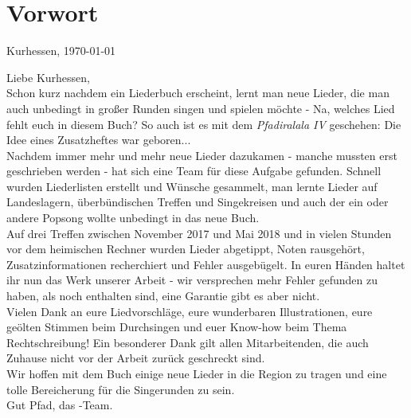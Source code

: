 \section*{Vorwort}

\begin{flushright} 
    Kurhessen, \today
\end{flushright}

Liebe Kurhessen, \\ 

Schon kurz nachdem ein Liederbuch erscheint, lernt man neue Lieder, die man auch unbedingt in großer Runden singen und spielen möchte - Na, welches Lied fehlt euch in diesem Buch? So auch ist es mit dem \emph{Pfadiralala IV} geschehen: Die Idee eines Zusatzheftes war geboren... \\

Nachdem immer mehr und mehr neue Lieder dazukamen - manche mussten erst geschrieben werden - hat sich eine Team für diese Aufgabe gefunden. Schnell wurden Liederlisten erstellt und Wünsche gesammelt, man lernte Lieder auf Landeslagern, überbündischen Treffen und Singekreisen und auch der ein oder andere Popsong wollte unbedingt in das neue Buch. \\

Auf drei Treffen zwischen November 2017 und Mai 2018 und in vielen Stunden vor dem heimischen Rechner wurden Lieder abgetippt, Noten rausgehört, Zusatzinformationen recherchiert und Fehler ausgebügelt. In euren Händen haltet ihr nun das Werk unserer Arbeit - wir versprechen mehr Fehler gefunden zu haben, als noch enthalten sind, eine Garantie gibt es aber nicht. \\

Vielen Dank an eure Liedvorschläge, eure wunderbaren Illustrationen, eure geölten Stimmen beim Durchsingen und euer Know-how beim Thema Rechtschreibung! Ein besonderer Dank gilt allen Mitarbeitenden, die auch Zuhause nicht vor der Arbeit zurück geschreckt sind. \\

Wir hoffen mit dem Buch einige neue Lieder in die Region zu tragen und eine tolle Bereicherung für die Singerunden zu sein. \\

Gut Pfad, das \bookname{}-Team.
